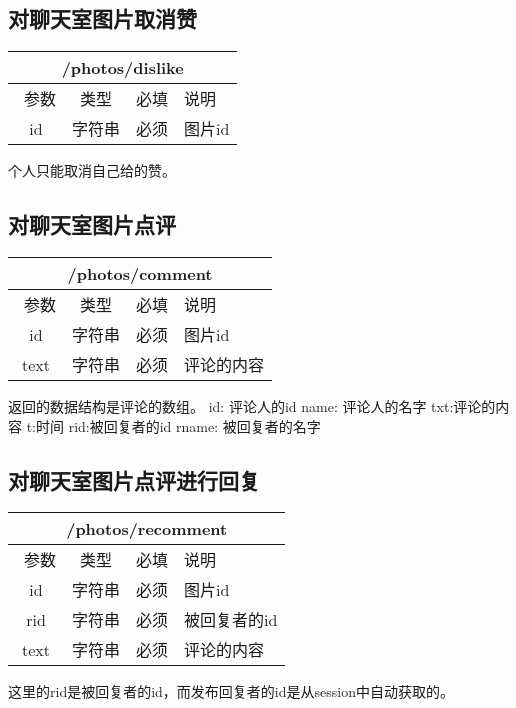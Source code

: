 \documentclass[cs4size]{ctexartutf8}
\begin{document}
\subsection{对聊天室图片取消赞}

\begin{table}[H]
   \begin{center}
\begin{tabular}{|c|c|c|p{12cm}|}
\hline
\multicolumn{4}{|c|}{/photos/dislike} \\
\hline\hline
 \  参数  & 类型 & 必填 &  说明  \\
  \hline
 id  & 字符串 & 必须 & 图片id\\
\hline
\end{tabular}
   \end{center}
\end{table}
个人只能取消自己给的赞。


\subsection{对聊天室图片点评}

\begin{table}[H]
   \begin{center}
\begin{tabular}{|c|c|c|p{12cm}|}
\hline
\multicolumn{4}{|c|}{/photos/comment} \\
\hline\hline
 \  参数  & 类型 & 必填 &  说明  \\
  \hline
 id  & 字符串 & 必须 & 图片id\\
   \hline
 text  & 字符串 & 必须 & 评论的内容\\
\hline
\end{tabular}
   \end{center}
\end{table}

返回的数据结构是评论的数组。
 id: 评论人的id
 name: 评论人的名字
 txt:评论的内容
 t:时间
 rid:被回复者的id
 rname: 被回复者的名字


\subsection{对聊天室图片点评进行回复}

\begin{table}[H]
   \begin{center}
\begin{tabular}{|c|c|c|p{12cm}|}
\hline
\multicolumn{4}{|c|}{/photos/recomment} \\
\hline\hline
 \  参数  & 类型 & 必填 &  说明  \\
  \hline
 id  & 字符串 & 必须 & 图片id\\
 \hline
 rid  & 字符串 & 必须 & 被回复者的id\\
   \hline
 text  & 字符串 & 必须 & 评论的内容\\
\hline
\end{tabular}
   \end{center}
\end{table}
这里的rid是被回复者的id，而发布回复者的id是从session中自动获取的。
\end{document}
